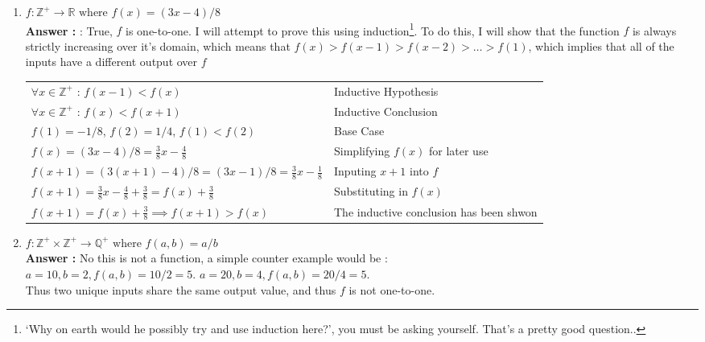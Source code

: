 \documentclass[a4paper,10pt]{article}
\newcommand{\answer}{\textbf{Answer : }}
\begin{document}
\begin{enumerate}
    \begin{enumerate}
    \item $f : \mathbb{Z}^{+} \to \mathbb{R} \text{ where } f(x) = (3x-4)/8$ \\
    \answer : True, $f$ is one-to-one. I will attempt to prove this using induction\footnote{`Why on earth would he possibly try and use induction here?', you must be asking yourself. That's a pretty good question..}. To do this, I will show that the function $f$ is always strictly increasing over it's domain, which means that $f(x) > f(x-1) > f(x-2) > \ldots > f(1)$, which implies that all of the inputs have a different output over $f$ \\[.15in]
        \begin{tabular}{l | l}
        $\forall x \in \mathbb{Z}^+$ : $f(x-1) < f(x)$                           & \quad Inductive Hypothesis \\
        $\forall x \in \mathbb{Z}^+$ : $f(x) < f(x+1)$                           & \quad Inductive Conclusion \\
        $f(1)= -1/8$, $f(2) = 1/4$, $f(1) < f(2)$                                & \quad Base Case \\
        $f(x) = (3x-4)/8 =  \frac{3}{8}x - \frac{4}{8}$                          & \quad Simplifying $f(x)$ for later use \\
        $f(x+1) = (3(x+1)-4)/8 = (3x - 1)/8 = \frac{3}{8}x - \frac{1}{8}$        & \quad Inputing $x+1$ into $f$ \\
        $f(x+1) = \frac{3}{8}x - \frac{4}{8} + \frac{3}{8} = f(x) + \frac{3}{8}$ & \quad Substituting in $f(x)$ \\
        $f(x+1) = f(x) + \frac{3}{8} \implies f(x+1) > f(x)$                     & \quad The inductive conclusion has been shwon \\[.1in]

        \end{tabular}

    \item $f : \mathbb{Z}^{+} \times \mathbb{Z}^+ \to \mathbb{Q}^+ \text{ where } f(a, b) = a/b$ \\
    \answer No this is not a function, a simple counter example would be : \\
    $a = 10, b = 2, f(a, b) = 10/2 = 5$. $a = 20, b = 4, f(a, b) = 20/4 = 5$. \\
    Thus two unique inputs share the same output value, and thus $f$ is not one-to-one.\\


\end{enumerate}
\end{enumerate}
\end{document}

